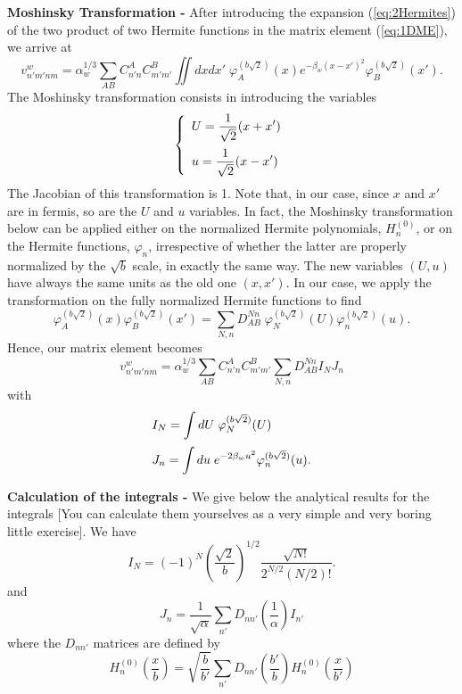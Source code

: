 {\bf Moshinsky Transformation - } After introducing the expansion 
(\ref{eq:2Hermites}) of the two product of two Hermite functions in the matrix 
element (\ref{eq:1DME}), we arrive at
\begin{equation}
v_{n'm'nm}^{w}
= \alpha_{w}^{1/3} \sum_{AB} C_{n'n}^{A}C_{m'm'}^{B} \iint dxdx' \; 
\varphi^{(b\sqrt{2})}_{A}(x)e^{-\beta_{w}(x - x')^{2}} 
\varphi^{(b\sqrt{2})}_{B}(x').
\end{equation}
The Moshinsky transformation consists in introducing the variables
\begin{equation}
\left\{
\begin{array}{l}
U = \displaystyle\frac{1}{\sqrt{2}} (x + x') \medskip\\
u = \displaystyle\frac{1}{\sqrt{2}} (x - x')
\end{array}
\right.
\end{equation}
The Jacobian of this transformation is 1. Note that, in our case, since $x$ and 
$x'$ are in fermis, so are the $U$ and $u$ variables. In fact, the Moshinsky 
transformation below can be applied either on the normalized Hermite 
polynomials, $H_{n}^{(0)}$, or on the Hermite functions, $\varphi_{n}$, 
irrespective of whether the latter are properly normalized by the $\sqrt{b}$ 
scale, in exactly the same way. The new variables $(U,u)$ have always the same 
units as the old one $(x,x')$. In our case, we apply the transformation on the 
fully normalized Hermite functions to find
\begin{equation}
\varphi^{(b\sqrt{2})}_{A}(x)\varphi^{(b\sqrt{2})}_{B}(x')
=
\sum_{N,n} D_{AB}^{Nn}\; \varphi^{(b\sqrt{2})}_{N}(U)\varphi^{(b\sqrt{2})}_{n}(u).
\end{equation}
Hence, our matrix element becomes
\begin{equation}
v_{n'm'nm}^{w}
= \alpha_{w}^{1/3} \sum_{AB} C_{n'n}^{A}C_{m'm'}^{B} \sum_{N,n} D_{AB}^{Nn}
I_{N} J_{n}
\end{equation}
with
\begin{equation}
\begin{array}{l}
I_{N} = \displaystyle\int dU\; \varphi^{(b\sqrt{2})}_{N}(U) \medskip\\
J_{n} = \displaystyle\int du\; e^{-2\beta_{w}u^{2}} \varphi^{(b\sqrt{2})}_{n}(u).
\end{array}
\end{equation}

{\bf Calculation of the integrals - } We give below the analytical results for 
the integrals [You can calculate them yourselves as a very simple and very 
boring little exercise]. We have
\begin{equation}
I_{N} 
= (-1)^{N}\left( \frac{\sqrt{2}}{b} \right)^{1/2}
\frac{\sqrt{N!}}{2^{N/2}(N/2)!}.
\end{equation}
and
\begin{equation}
J_{n} 
= \frac{1}{\sqrt{\alpha}}\sum_{n'} D_{nn'}\left( \frac{1}{\alpha} \right)  I_{n'}
\end{equation}
where the $D_{nn'}$ matrices are defined by
\begin{equation}
H_{n}^{(0)}\left(\frac{x}{b}\right) =
\sqrt{\frac{b}{b'}} \sum_{n'} D_{nn'}\left( \frac{b'}{b} \right) 
H_{n}^{(0)}\left(\frac{x}{b'}\right)
\end{equation}

